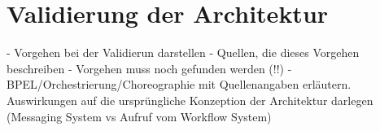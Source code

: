 
\chapter{Validierung der Architektur} %
\label{cha:validierung_der_architektur}

- Vorgehen bei der Validierun darstellen
- Quellen, die dieses Vorgehen beschreiben
- Vorgehen muss noch gefunden werden (!!)
- BPEL/Orchestrierung/Choreographie mit Quellenangaben erläutern. Auswirkungen auf die ursprüngliche Konzeption der Architektur darlegen (Messaging System vs Aufruf vom Workflow System)

